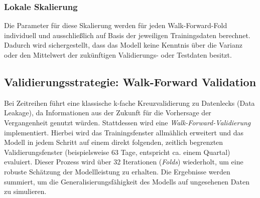 \subsubsection{Lokale Skalierung}
Die Parameter für diese Skalierung werden für jeden Walk-Forward-Fold individuell und ausschließlich auf Basis der jeweiligen Trainingsdaten berechnet.
Dadurch wird sichergestellt, dass das Modell keine Kenntnis über die Varianz oder den Mittelwert der zukünftigen Validierungs- oder Testdaten besitzt.

\subsection{Validierungsstrategie: Walk-Forward Validation}
Bei Zeitreihen führt eine klassische k-fache Kreuzvalidierung zu Datenlecks (Data Leakage), da Informationen aus der Zukunft für die Vorhersage der Vergangenheit genutzt würden.
Stattdessen wird eine \emph{Walk-Forward-Validierung} implementiert.
Hierbei wird das Trainingsfenster allmählich erweitert und das Modell in jedem Schritt auf einem direkt folgenden, zeitlich begrenzten Validierungsfenster (beispielsweise 63 Tage, entspricht ca. einem Quartal) evaluiert.
Dieser Prozess wird über 32 Iterationen (\emph{Folds}) wiederholt, um eine robuste Schätzung der Modellleistung zu erhalten.
Die Ergebnisse werden summiert, um die Generalisierungsfähigkeit des Modells auf ungesehenen Daten zu simulieren.

